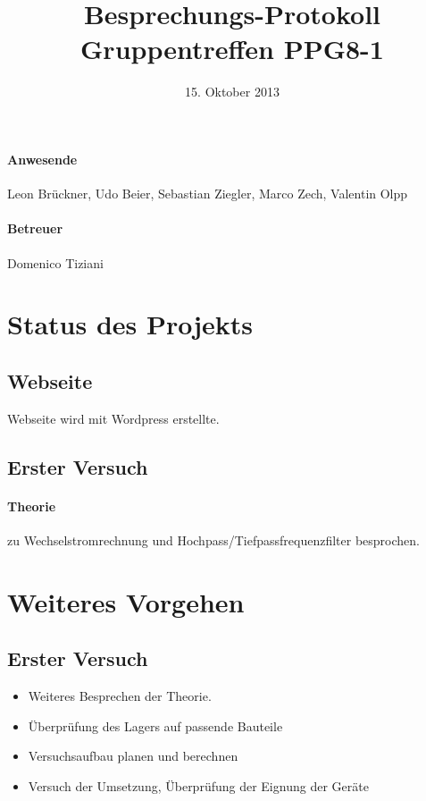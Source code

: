 \documentclass[
]{scrartcl}
\begin{document}
\title{Besprechungs-Protokoll Gruppentreffen PPG8-1}
\date{15. Oktober 2013}
\maketitle

\paragraph*{Anwesende}
Leon Brückner,
Udo Beier,
Sebastian Ziegler,
Marco Zech,
Valentin Olpp
\paragraph*{Betreuer}
Domenico Tiziani

\section{Status des Projekts}
\subsection{Webseite}
Webseite wird mit Wordpress erstellte.
\subsection{Erster Versuch}
\paragraph{Theorie} zu Wechselstromrechnung und Hochpass/Tiefpassfrequenzfilter besprochen.
\section{Weiteres Vorgehen}
\subsection{Erster Versuch}
\begin{itemize}
\item Weiteres Besprechen der Theorie.
\item Überprüfung des Lagers auf passende Bauteile
\item Versuchsaufbau planen und berechnen
\item Versuch der Umsetzung, Überprüfung der Eignung der Geräte
\end{itemize}
\end{document}
